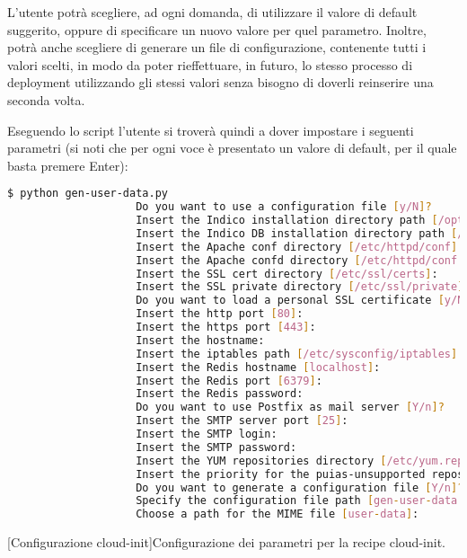             L'utente potrà scegliere, ad ogni domanda, di utilizzare il valore di default suggerito, oppure di specificare un nuovo valore per quel parametro. Inoltre, potrà anche scegliere di generare un file di configurazione, contenente tutti i valori scelti, in modo da poter rieffettuare, in futuro, lo stesso processo di deployment utilizzando gli stessi valori senza bisogno di doverli reinserire una seconda volta.
            
            Eseguendo lo script  l'utente si troverà quindi a dover impostare i seguenti parametri (si noti che per ogni voce è presentato un valore di default, per il quale basta premere Enter):
            
            \begin{center}
                \begin{lstlisting}[language=bash, gobble=18]
                    $ python gen-user-data.py 
                    Do you want to use a configuration file [y/N]? 
                    Insert the Indico installation directory path [/opt/indico]: 
                    Insert the Indico DB installation directory path [/opt/indico/db]: 
                    Insert the Apache conf directory [/etc/httpd/conf]: 
                    Insert the Apache confd directory [/etc/httpd/conf.d]: 
                    Insert the SSL cert directory [/etc/ssl/certs]: 
                    Insert the SSL private directory [/etc/ssl/private]: 
                    Do you want to load a personal SSL certificate [y/N]? 
                    Insert the http port [80]: 
                    Insert the https port [443]: 
                    Insert the hostname: 
                    Insert the iptables path [/etc/sysconfig/iptables]: 
                    Insert the Redis hostname [localhost]: 
                    Insert the Redis port [6379]: 
                    Insert the Redis password: 
                    Do you want to use Postfix as mail server [Y/n]? 
                    Insert the SMTP server port [25]: 
                    Insert the SMTP login: 
                    Insert the SMTP password: 
                    Insert the YUM repositories directory [/etc/yum.repos.d]: 
                    Insert the priority for the puias-unsupported repository [19]: 
                    Do you want to generate a configuration file [Y/n]? 
                    Specify the configuration file path [gen-user-data.conf]: 
                    Choose a path for the MIME file [user-data]:
                \end{lstlisting}
                \captionsetup{textformat=empty,labelformat=empty} \vspace{-2em}
                [Configurazione cloud-init]{Configurazione dei parametri per la recipe cloud-init.}
            \end{center}
            
